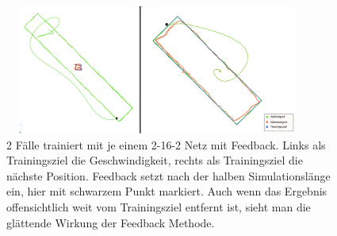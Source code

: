 \begin{figure}
	\centering
	\includegraphics[width=0.9\textwidth, height=160px]{pics/fb2.png}	
	\caption{2 Fälle trainiert mit je einem 2-16-2 Netz mit Feedback. Links als Trainingsziel die Geschwindigkeit, rechts als Trainingsziel die nächste Position. Feedback setzt nach der halben Simulationslänge ein, hier mit schwarzem Punkt markiert. Auch wenn das Ergebnis offensichtlich weit vom Trainingsziel entfernt ist, sieht man die glättende Wirkung der Feedback Methode.}
	\label{img:fb2}
\end{figure}




